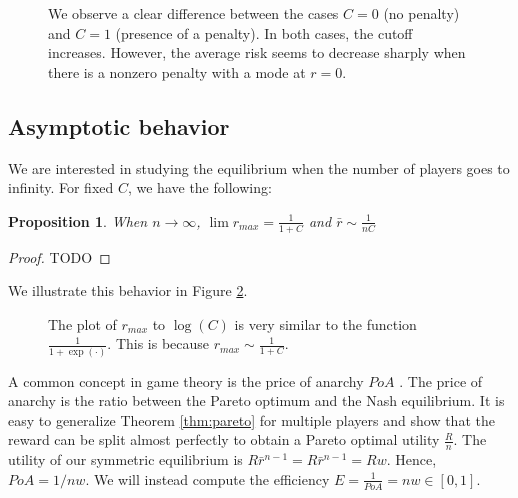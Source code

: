 \documentclass[preprint,12pt,authoryear,doubleblind]{elsarticle}
\newtheorem{proposition}[theorem]{Proposition}
\theoremstyle{definition}
\begin{document}
\begin{figure}[htbp]
  \centering
  \begin{minipage}[t]{0.48\textwidth}
    \centering
    
  \end{minipage}
  \hfill
  \begin{minipage}[t]{0.48\textwidth}
    \centering
    
  \end{minipage}
  \caption{We observe a clear difference between the cases $C=0$ (no penalty) and $C=1$ (presence of a penalty). In both cases, the cutoff increases. However, the average risk seems to decrease sharply when there is a nonzero penalty with a mode at $r=0$.}
  \label{fig:solution-multiple}  
\end{figure}

\subsection{Asymptotic behavior}

We are interested in studying the equilibrium when the number of players goes to infinity. For fixed $C$, we have the following:

\begin{proposition}When $n\rightarrow \infty$,
    $\lim {r_{max}} = \frac{1}{1+C}$ and $\bar r \sim \frac{1}{n C}$
\end{proposition}


\begin{proof}
TODO
\end{proof}

We illustrate this behavior in Figure \ref{fig:cutoff-asymptotic}.

\begin{figure}[htbp]
    \centering
    
    \caption{The plot of $r_{max}$ to $\log(C)$ is very similar to the function $\frac{1}{1 + \exp(\cdot)}$. This is because $r_{max} \sim \frac{1}{1+C}$.}
    \label{fig:cutoff-asymptotic}
\end{figure}



A common concept in game theory is the price of anarchy $PoA$ \citep{koutsoupias1999worst}. The price of anarchy is the ratio between the Pareto optimum and the Nash equilibrium. It is easy to generalize Theorem \ref{thm:pareto} for multiple players and show that the reward can be split almost perfectly to obtain a Pareto optimal utility $\frac{R}{n}$. The utility of our symmetric equilibrium is $R \bar r ^ {n-1} = R \bar r ^ {n-1} = R w$. Hence, $PoA = 1 / n w$. We will instead compute the efficiency $E = \frac{1}{PoA} = n w \in [0,1]$.
\end{document}
